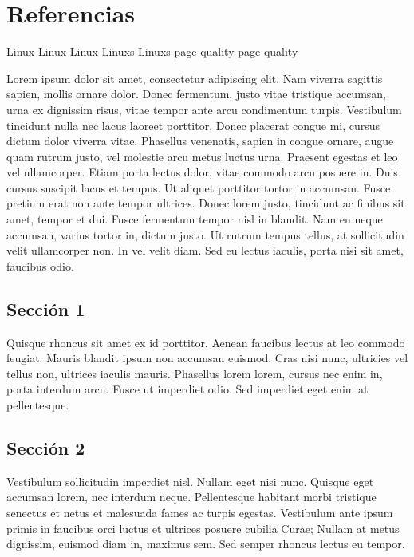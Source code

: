 \chapter{Referencias}

\gls{Linux} \Gls{Linux} \gls{Linux} \glspl{Linux} \Glspl{Linux} \gls{page quality} \gls{page quality} 

Lorem ipsum dolor sit amet, consectetur adipiscing elit. Nam viverra sagittis sapien, mollis ornare dolor. Donec fermentum, justo vitae tristique accumsan, urna ex dignissim risus, vitae tempor ante arcu condimentum turpis. Vestibulum tincidunt nulla nec lacus laoreet porttitor. Donec placerat congue mi, cursus dictum dolor viverra vitae. Phasellus venenatis, sapien in congue ornare, augue quam rutrum justo, vel molestie arcu metus luctus urna. Praesent egestas et leo vel ullamcorper. Etiam porta lectus dolor, vitae commodo arcu posuere in. Duis cursus suscipit lacus et tempus. Ut aliquet porttitor tortor in accumsan. Fusce pretium erat non ante tempor ultrices. Donec lorem justo, tincidunt ac finibus sit amet, tempor et dui. Fusce fermentum tempor nisl in blandit. Nam eu neque accumsan, varius tortor in, dictum justo. Ut rutrum tempus tellus, at sollicitudin velit ullamcorper non. In vel velit diam. Sed eu lectus iaculis, porta nisi sit amet, faucibus odio.

	\section{Sección 1}
	
	Quisque rhoncus sit amet ex id porttitor. Aenean faucibus lectus at leo commodo feugiat. Mauris blandit ipsum non accumsan euismod. Cras nisi nunc, ultricies vel tellus non, ultrices iaculis mauris. Phasellus lorem lorem, cursus nec enim in, porta interdum arcu. Fusce ut imperdiet odio. Sed imperdiet eget enim at pellentesque.
	
	\section{Sección 2}
	
	Vestibulum sollicitudin imperdiet nisl. Nullam eget nisi nunc. Quisque eget accumsan lorem, nec interdum neque. Pellentesque habitant morbi tristique senectus et netus et malesuada fames ac turpis egestas. Vestibulum ante ipsum primis in faucibus orci luctus et ultrices posuere cubilia Curae; Nullam at metus dignissim, euismod diam in, maximus sem. Sed semper rhoncus lectus eu tempor.
	
